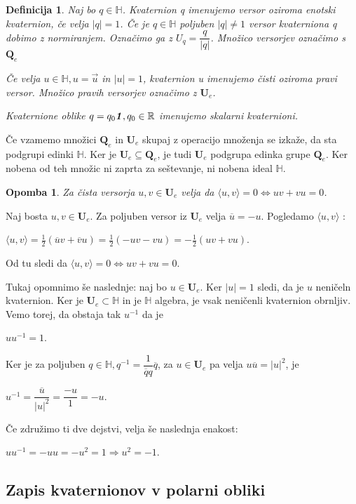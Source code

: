 \documentclass[a4paper,12pt]{article}
\def\R{\mathbb{R}} %
\def\H{\mathbb{H}} %
\def\Qe{\textbf{Q}_{e}} %
\def\Ue{\textbf{U}_{e}} %
\def\1{\textbf{\emph{1}}}
\newcommand{\dotpr}[2]{\langle #1, #2 \rangle}
\newtheorem{opomba}{Opomba}
\newtheorem{definicija}{Definicija}
\begin{document}
\begin{definicija}
   Naj bo $q \in \H$. Kvaternion q imenujemo \emph{versor} oziroma \emph{enotski kvaternion}, če velja
   $|q| = 1$. Če je $q \in \H$ poljuben $|q| \neq 1$ versor kvaterniona q dobimo z normiranjem. Označimo ga z $U_{q} = \dfrac{q}{|q|}$. 
   Množico versorjev označimo s $\Qe$

   Če velja $u \in \H, u = \vec{u}$ in $|u| = 1$, kvaternion u imenujemo \emph{čisti} oziroma \emph{pravi} versor.
   Množico pravih versorjev označimo z $\Ue$.

   Kvaternione oblike $q = q_{0}\1, q_{0} \in \R$ imenujemo \emph{skalarni kvaternioni.}
\end{definicija}
Če vzamemo množici $\Qe$ in $\Ue$ skupaj z operacijo množenja se izkaže, da sta podgrupi edinki $\H$.
Ker je $\Ue \subseteq \Qe$, je tudi $\Ue$ podgrupa edinka grupe $\Qe$. Ker nobena od teh množic ni zaprta za seštevanje, ni nobena ideal $\H$.
\begin{opomba}
   Za čista versorja $u, v \in \Ue$ velja da $\dotpr{u}{v} = 0 \iff uv + vu = 0$.
\end{opomba}
Naj bosta $u, v \in \Ue$. Za poljuben versor iz $\Ue$ velja $\overline{u} = -u$. Pogledamo $\dotpr{u}{v}$ :
\begin{center}
   $\dotpr{u}{v} = \frac{1}{2}(\overline{u}v + \overline{v}u) = \frac{1}{2}(-uv -vu) = -\frac{1}{2}(uv + vu)$.
\end{center}
Od tu sledi da $\dotpr{u}{v} = 0 \iff uv + vu = 0$.

\break
Tukaj opomnimo še naslednje: naj bo $u \in \Ue$. Ker $|u| = 1$ sledi, da je $u$ neničeln kvaternion.
Ker je $\Ue \subset \H$ in je $\H$ algebra, je vsak neničenli kvaternion obrnljiv. Vemo torej, da obstaja tak $u^{-1}$ da je
\begin{center}
   $uu^{-1} = 1$.
\end{center}
Ker je za poljuben $q \in \H, q^{-1} = \dfrac{1}{\overline{q}q} \overline{q}$, za $u \in \Ue$ pa velja $u\overline{u} = |u|^2$, je 
\begin{center}
   $u^{-1} = \dfrac{\overline{u}}{|u|^2} = \dfrac{-u}{1} = -u$.
\end{center}
Če združimo ti dve dejstvi, velja še naslednja enakost:
\begin{center}
   $uu^{-1} = -uu = -u^2 = 1 \Rightarrow u^2 = -1$.
\end{center}

\subsection{Zapis  kvaternionov v polarni obliki}
\end{document}
